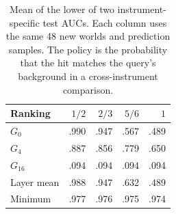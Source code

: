 \begin{table}[tb]
\centering\small
\caption{Mean of the lower of two instrument-specific test AUCs. Each column uses the same 48 new worlds and prediction samples. The policy is the probability that the hit matches the query's background in a cross-instrument comparison.}
\label{tab:acquisition}
\begin{tabular}{@{}lrrrr@{}}\toprule
Ranking & $1/2$ & $2/3$ & $5/6$ & $1$\\\midrule
$G_0$ & .990 & .947 & .567 & .489\\
$G_4$ & .887 & .856 & .779 & .650\\
$G_{16}$ & .094 & .094 & .094 & .094\\
Layer mean & .988 & .947 & .632 & .489\\
Minimum & .977 & .976 & .975 & .974\\\bottomrule
\end{tabular}
\end{table}
